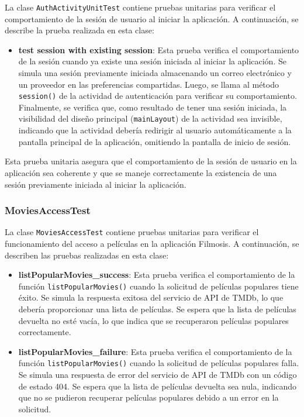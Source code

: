 \documentclass{article}
\begin{document}
La clase \texttt{AuthActivityUnitTest} contiene pruebas unitarias para verificar el comportamiento de la sesión de usuario al iniciar la aplicación. A continuación, se describe la prueba realizada en esta clase:

\begin{itemize}
    \item \textbf{test session with existing session}: Esta prueba verifica el comportamiento de la sesión cuando ya existe una sesión iniciada al iniciar la aplicación. Se simula una sesión previamente iniciada almacenando un correo electrónico y un proveedor en las preferencias compartidas. Luego, se llama al método \texttt{session()} de la actividad de autenticación para verificar su comportamiento. Finalmente, se verifica que, como resultado de tener una sesión iniciada, la visibilidad del diseño principal (\texttt{mainLayout}) de la actividad sea invisible, indicando que la actividad debería redirigir al usuario automáticamente a la pantalla principal de la aplicación, omitiendo la pantalla de inicio de sesión.
\end{itemize}

Esta prueba unitaria asegura que el comportamiento de la sesión de usuario en la aplicación sea coherente y que se maneje correctamente la existencia de una sesión previamente iniciada al iniciar la aplicación.


\subsubsection{MoviesAccessTest}

La clase \texttt{MoviesAccessTest} contiene pruebas unitarias para verificar el funcionamiento del acceso a películas en la aplicación Filmosis. A continuación, se describen las pruebas realizadas en esta clase:

\begin{itemize}
    \item \textbf{listPopularMovies\_success}: Esta prueba verifica el comportamiento de la función \texttt{listPopularMovies()} cuando la solicitud de películas populares tiene éxito. Se simula la respuesta exitosa del servicio de API de TMDb, lo que debería proporcionar una lista de películas. Se espera que la lista de películas devuelta no esté vacía, lo que indica que se recuperaron películas populares correctamente.
    
    \item \textbf{listPopularMovies\_failure}: Esta prueba verifica el comportamiento de la función \texttt{listPopularMovies()} cuando la solicitud de películas populares falla. Se simula una respuesta de error del servicio de API de TMDb con un código de estado 404. Se espera que la lista de películas devuelta sea nula, indicando que no se pudieron recuperar películas populares debido a un error en la solicitud.
\end{itemize}
\end{document}
